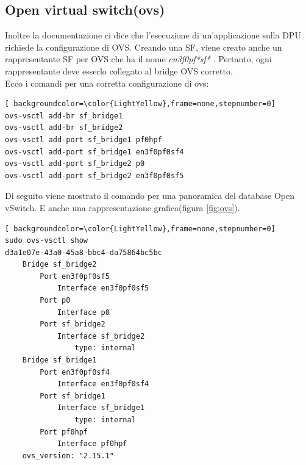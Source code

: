 \documentclass[binding=0.6cm]{sapthesis}
\theoremstyle{definition}
\begin{document}
\subsection{Open virtual switch(ovs)}
Inoltre la documentazione ci dice che l'esecuzione di un'applicazione sulla DPU 
richiede la configurazione di OVS. Creando una SF, viene creato anche un rappresentante 
SF per OVS che ha il nome \textsl{en3f0pf*sf*} . Pertanto, ogni rappresentante deve esserlo collegato 
al bridge OVS corretto. \\
Ecco i comandi per una corretta configurazione di ovs:
\begin{lstlisting}[ backgroundcolor=\color{LightYellow},frame=none,stepnumber=0]
ovs-vsctl add-br sf_bridge1
ovs-vsctl add-br sf_bridge2
ovs-vsctl add-port sf_bridge1 pf0hpf
ovs-vsctl add-port sf_bridge1 en3f0pf0sf4
ovs-vsctl add-port sf_bridge2 p0
ovs-vsctl add-port sf_bridge2 en3f0pf0sf5 
\end{lstlisting}
Di seguito viene mostrato il comando per una panoramica del database Open vSwitch.
E anche una rappresentazione grafica(figura \ref{fig:ovs}).
\begin{lstlisting}[ backgroundcolor=\color{LightYellow},frame=none,stepnumber=0]
sudo ovs-vsctl show
d3a1e07e-43a0-45a8-bbc4-da75864bc5bc
    Bridge sf_bridge2
        Port en3f0pf0sf5
            Interface en3f0pf0sf5
        Port p0
            Interface p0
        Port sf_bridge2
            Interface sf_bridge2
                type: internal
    Bridge sf_bridge1
        Port en3f0pf0sf4
            Interface en3f0pf0sf4
        Port sf_bridge1
            Interface sf_bridge1
                type: internal
        Port pf0hpf
            Interface pf0hpf
    ovs_version: "2.15.1"

\end{lstlisting}
\end{document}
